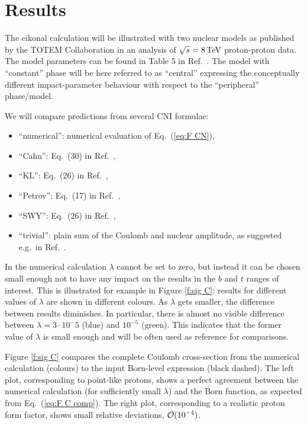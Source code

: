\documentclass[pdftex,twocolumn,epjc3]{svjour3}
\def\un#1{\,{\rm #1}}
\begin{document}
\section{Results}
\label{sec:results}

The eikonal calculation will be illustrated with two nuclear models as published by the TOTEM Collaboration in an analysis of $\sqrt s = 8\un{TeV}$ proton-proton data. The model parameters can be found in Table 5 in Ref.~\cite{totem-8tev-1km}. The model with ``constant'' phase will be here referred to as ``central'' expressing the conceptually different impact-parameter behaviour with respect to the ``peripheral'' phase/model.

We will compare predictions from several CNI formulae:
\begin{itemize}
\item ``numerical'': numerical evaluation of Eq.~(\ref{eq:F CN}),
\item ``Cahn'': Eq.~(30) in Ref.~\cite{cahn82},
\item ``KL'': Eq.~(26) in Ref.~\cite{kl94},
\item ``Petrov'': Eq.~(17) in Ref.~\cite{petrov2018},
\item ``SWY'': Eq.~(26) in Ref.~\cite{wy68},
\item ``trivial'': plain sum of the Coulomb and nuclear amplitude, as suggested e.g.~in Ref.~\cite{godizov2019}.
\end{itemize}

In the numerical calculation $\lambda$ cannot be set to zero, but instead it can be chosen small enough not to have any impact on the results in the $b$ and $t$ ranges of interest. This is illustrated for example in Figure \ref{f:sig C}: results for different values of $\lambda$ are shown in different colours. As $\lambda$ gets smaller, the difference between results diminishes. In particular, there is almost no visible difference between $\lambda = 3\cdot 10^-5$ (blue) and $10^{-5}$ (green). This indicates that the former value of $\lambda$ is small enough and will be often used as reference for comparisons.

Figure \ref{f:sig C} compares the complete Coulomb cross-section from the numerical calculation (colours) to the input Born-level expression (black dashed). The left plot, corresponding to point-like protons, shows a perfect agreement between the numerical calculation (for sufficiently small $\lambda$) and the Born function, as expected from Eq.~(\ref{eq:F C comp}). The right plot, corresponding to a realistic proton form factor, shows small relative deviations, ${\cal O}(10^{-4})$.
\end{document}
